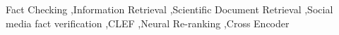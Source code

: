 \documentclass{ceurart}
\begin{document}
  \begin{keywords}
    Fact Checking \sep Information Retrieval \sep Scientific Document Retrieval \sep Social media fact verification \sep CLEF \sep Neural Re-ranking \sep Cross Encoder
  \end{keywords}

  \maketitle


  

  

  

  

  

  

  

  
\end{document}
